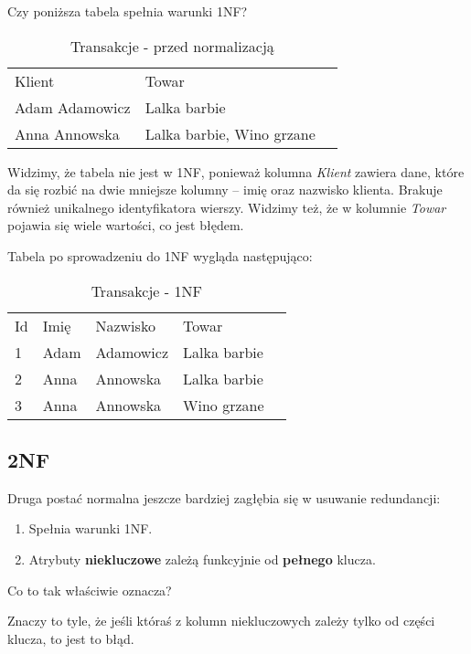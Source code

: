 Czy poniższa tabela spełnia warunki 1NF?

\begin{table}[H]
	\centering
	\caption{Transakcje - przed normalizacją}
	\begin{tabular}{|l|l|l}
		\cline{1-2}
		Klient         & Towar          & \\ \cline{1-2}
		Adam Adamowicz & Lalka barbie   & \\ \cline{1-2}
		Anna Annowska  & Lalka barbie, Wino grzane &  \\ \cline{1-2}
	\end{tabular}
\end{table}

Widzimy, że tabela nie jest w 1NF, ponieważ kolumna \textit{Klient} zawiera dane, które da się rozbić na dwie mniejsze kolumny -- imię oraz nazwisko klienta.
Brakuje również unikalnego identyfikatora wierszy.
Widzimy też, że w kolumnie \textit{Towar} pojawia się wiele wartości, co jest błędem.

Tabela po sprowadzeniu do 1NF wygląda następująco:
\begin{table}[H]
	\centering
	\caption{Transakcje - 1NF}
	\begin{tabular}{|l|l|l|l|l}
		\cline{1-4}
		Id & Imię & Nazwisko  & Towar          & \\ \cline{1-4}
		1  & Adam & Adamowicz & Lalka barbie   & \\ \cline{1-4}
		2  & Anna & Annowska  & Lalka barbie   & \\ \cline{1-4}
		3  & Anna & Annowska  & Wino grzane    & \\ \cline{1-4}
	\end{tabular}
\end{table}

\subsection*{2NF}
Druga postać normalna jeszcze bardziej zagłębia się w usuwanie redundancji:
\begin{enumerate}
	\item{Spełnia warunki 1NF.}
	\item{Atrybuty \textbf{niekluczowe} zależą funkcyjnie od \textbf{pełnego} klucza.}
\end{enumerate}

Co to tak właściwie oznacza?

Znaczy to tyle, że jeśli któraś z kolumn niekluczowych zależy tylko od części klucza, to jest to błąd.

